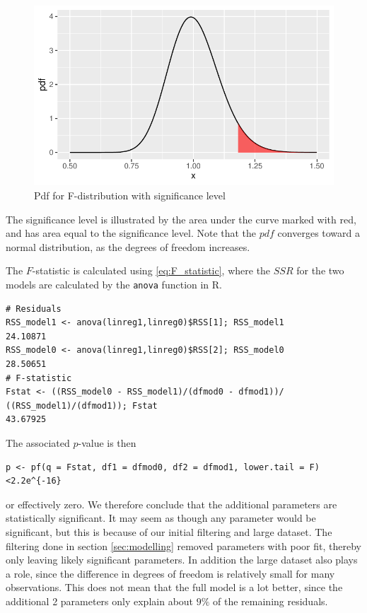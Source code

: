     
\begin{figure}[H]
    \centering
  \includegraphics[width = 0.7 \textwidth]{figures/Nanna/Fdistsign.pdf}
  \caption{Pdf for F-distribution with significance level}
  \label{fig:f_dist}
\end{figure}
    
The significance level is illustrated by the area under the curve marked with red, and has area equal to the significance level.
Note that the $pdf$ converges toward a normal distribution, as the degrees of freedom increases.
    
The $F$-statistic is calculated using \eqref{eq:F_statistic}, where the $SSR$ for the two models are calculated by the \texttt{anova} function in R. 
\begin{lstlisting}
# Residuals
RSS_model1 <- anova(linreg1,linreg0)$RSS[1]; RSS_model1
24.10871
RSS_model0 <- anova(linreg1,linreg0)$RSS[2]; RSS_model0
28.50651
# F-statistic
Fstat <- ((RSS_model0 - RSS_model1)/(dfmod0 - dfmod1))/
((RSS_model1)/(dfmod1)); Fstat
43.67925
\end{lstlisting}
The associated $p$-value is then
\begin{lstlisting}
p <- pf(q = Fstat, df1 = dfmod0, df2 = dfmod1, lower.tail = F)
<2.2e^{-16}
\end{lstlisting}
or effectively zero. We therefore conclude that the additional parameters are statistically significant.
It may seem as though any parameter would be significant, but this is because of our initial filtering and large dataset.
The filtering done in section \ref{sec:modelling} removed parameters with poor fit, thereby only leaving likely significant parameters.
In addition the large dataset also plays a role, since the difference in degrees of freedom is relatively small for many observations. 
This does not mean that the full model is a lot better, since the additional 2 parameters only explain about $9\%$ of the remaining residuals. 

